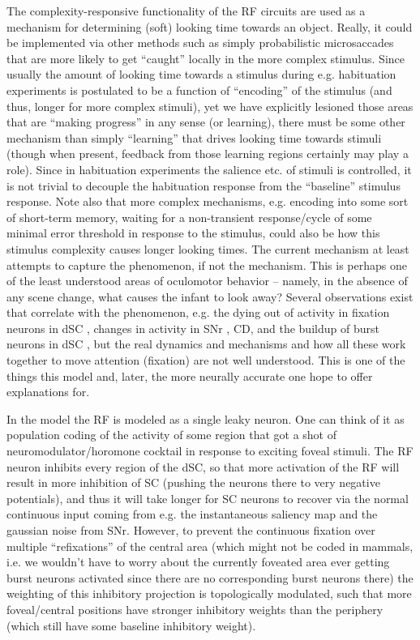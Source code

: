 \documentclass[conference]{IEEEtran}
\begin{document}
The complexity-responsive functionality of the RF circuits are used as
a mechanism for determining (soft) looking time towards an
object. Really, it could be implemented via other methods such as
simply probabilistic microsaccades that are more likely to get
``caught'' locally in the more complex stimulus. Since usually the
amount of looking time towards a stimulus during e.g. habituation
experiments is postulated to be a function of ``encoding'' of the
stimulus (and thus, longer for more complex stimuli), yet we have
explicitly lesioned those areas that are ``making progress'' in any
sense (or learning), there must be some other mechanism than simply
``learning'' that drives looking time towards stimuli (though when
present, feedback from those learning regions certainly may play a
role). Since in habituation experiments the salience etc. of stimuli
is controlled, it is not trivial to decouple the habituation response
from the ``baseline'' stimulus response. Note also that more complex
mechanisms, e.g. encoding into some sort of short-term memory, waiting
for a non-transient response/cycle of some minimal error threshold in
response to the stimulus, could also be how this stimulus complexity
causes longer looking times. The current mechanism at least attempts
to capture the phenomenon, if not the mechanism. This is perhaps one
of the least understood areas of oculomotor behavior -- namely, in the
absence of any scene change, what causes the infant to look away?
Several observations exist that correlate with the phenomenon,
e.g. the dying out of activity in fixation neurons in dSC
\cite{munoz_wurtz_1995_SCfixationburstneurons1}, changes in activity
in SNr \cite{hikosaka_wurtz_1983_SNr1}, CD, and the buildup of burst
neurons in dSC \cite{munoz_wurtz_1995_SCspreadactivitysaccade2}, but
the real dynamics and mechanisms and how all these work together to
move attention (fixation) are not well understood. This is one of the
things this model and, later, the more neurally accurate one hope to
offer explanations for.

In the model the RF is modeled as a single leaky neuron. One can think
of it as population coding of the activity of some region that got a
shot of neuromodulator/horomone cocktail in response to exciting
foveal stimuli. The RF neuron inhibits every region of the dSC, so
that more activation of the RF will result in more inhibition of SC
(pushing the neurons there to very negative potentials), and thus it
will take longer for SC neurons to recover via the normal continuous
input coming from e.g. the instantaneous saliency map and the gaussian
noise from SNr. However, to prevent the continuous fixation over
multiple ``refixations'' of the central area (which might not be coded
in mammals, i.e. we wouldn't have to worry about the currently
foveated area ever getting burst neurons activated since there are no
corresponding burst neurons there) the weighting of this inhibitory
projection is topologically modulated, such that more foveal/central
positions have stronger inhibitory weights than the periphery (which
still have some baseline inhibitory weight).
\end{document}
